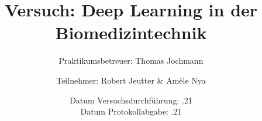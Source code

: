 \documentclass[a4paper,10pt,titlepage]{scrartcl}
\begin{document}
\titlehead
{
    \small
    {
        Technische Universität Ilmenau\\
        Fakultät für Informatik und Automatisierung\\
        Institut für Biomedizinische Technik und Informatik\\

        Laborpraktikum BMT\\
        WS 2021/22}
}

\title {Versuch: Deep Learning in der Biomedizintechnik}
\subtitle{Praktikumsbetreuer: Thomas Jochmann}
\author{Teilnehmer: Robert Jeutter \& Amèle Nya}
\date{
    Datum Versuchsdurchführung: .21\\
    Datum Protokollabgabe: .21
}
\maketitle

\pagestyle{fancy}
\newpage
\end{document}
